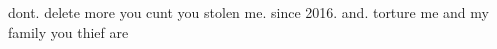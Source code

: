 dont. delete more you cunt you stolen me. since 2016. and.    torture me and my family you thief are 
